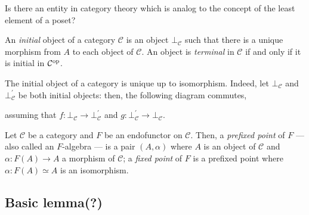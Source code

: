 Is there an entity in category theory which is analog to the concept of the least element of a poset?

\begin{dfn}
  An \emph{initial} object of a category \(\mathcal{C}\) is an object \(\bot_{\mathcal{C}}\) such that there is a unique morphism from \(A\) to each object of \(\mathcal{C}\).
  An object is \emph{terminal} in \(\mathcal{C}\) if and only if it is initial in \(\mathcal{C}^\textup{op}\).
\end{dfn}

The initial object of a category is unique up to isomorphism. Indeed, let \(\bot_{\mathcal{C}}\) and \(\bot_{\mathcal{C}}^\prime\) be both initial objects: then, the following diagram commutes,
\begin{center}
\end{center}
assuming that \(f \colon \bot_{\mathcal{C}} \to \bot_{\mathcal{C}}^\prime\) and \(g \colon \bot_{\mathcal{C}}^\prime \to \bot_{\mathcal{C}}\).

\begin{dfn}
  Let \(\mathcal{C}\) be a category and \(F\) be an endofunctor on \(\mathcal{C}\).
  Then, a \emph{prefixed point} of \(F\) --- also called an \(F\)-algebra --- is a pair \((A,\alpha)\) where \(A\) is an object of \(\mathcal{C}\) and \(\alpha \colon F(A) \to A\) a morphism of \(\mathcal{C}\); a \emph{fixed point} of \(F\) is a prefixed point where \(\alpha \colon F(A) \simeq A\) is an isomorphism.
\end{dfn}

\subsection{Basic lemma(?)}


